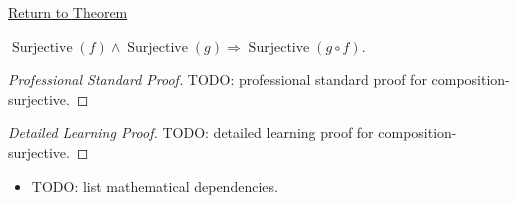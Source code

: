 \newpage
{}
\label{prf:composition-surjective}

\begin{remark*}[Return]
\hyperref[prop:composition-surjective]{Return to Theorem}
\end{remark*}

\begin{proposition*}
$\operatorname{Surjective}(f)\wedge\operatorname{Surjective}(g)
\Rightarrow\operatorname{Surjective}(g\circ f)$.

\smallskip\noindent
\end{proposition*}

\begin{proof}[Professional Standard Proof]
\LRAProofBodyStart
TODO: professional standard proof for composition-surjective.
\end{proof}

\begin{proof}[Detailed Learning Proof]
\LRAProofBodyStart
TODO: detailed learning proof for composition-surjective.
\end{proof}

\begin{remark*}
\end{remark*}

\begin{dependencies}
\begin{itemize}
  \item TODO: list mathematical dependencies.
\end{itemize}
\end{dependencies}

\clearpage
